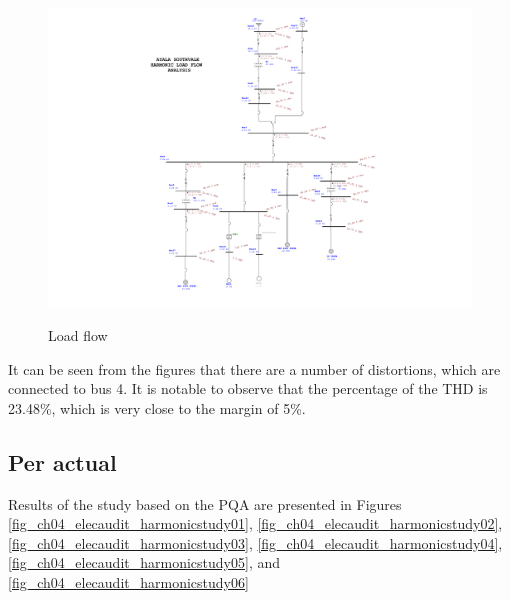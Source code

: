 \begin{figure}
	\includegraphics[width=\textwidth]{figures/fig_ch04_elecaudit_harmonic_load_flow.pdf} \\
	\caption{Load flow}
	\label{fig_ch04_elecaudit_harmonic_load_flow} 
\end{figure}

It can be seen from the figures that there are a number of distortions, which are connected to bus 4. It is notable to observe that the percentage of the THD is 23.48\%, which is very close to the margin of 5\%.


\subsection{Per actual}
Results of the study based on the PQA are presented in Figures \ref{fig_ch04_elecaudit_harmonicstudy01}, \ref{fig_ch04_elecaudit_harmonicstudy02}, \ref{fig_ch04_elecaudit_harmonicstudy03}, \ref{fig_ch04_elecaudit_harmonicstudy04}, \ref{fig_ch04_elecaudit_harmonicstudy05}, and \ref{fig_ch04_elecaudit_harmonicstudy06}

